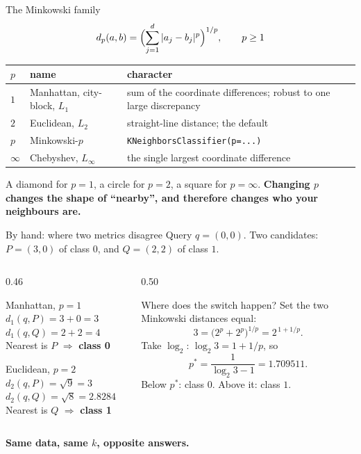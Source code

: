 \documentclass[aspectratio=169]{beamer}
\begin{document}
\begin{frame}[shrink=7]{The Minkowski family}
  \[
    d_p(a, b) = \Bigl( \sum_{j=1}^{d} |a_j - b_j|^{p} \Bigr)^{1/p},
    \qquad p \ge 1
  \]
  \begin{center}\small
  \begin{tabular}{@{}llp{6.8cm}@{}}
    \toprule
    $p$ & name & character\\
    \midrule
    $1$ & Manhattan, city-block, $L_1$ & sum of the coordinate differences;
      robust to one large discrepancy\\
    $2$ & Euclidean, $L_2$ & straight-line distance; the default\\
    $p$ & Minkowski-$p$ & \texttt{KNeighborsClassifier(p=...)}\\
    $\infty$ & Chebyshev, $L_\infty$ & the single largest coordinate
      difference\\
    \bottomrule
  \end{tabular}
  \end{center}
  \begin{center}\small
    A diamond for $p=1$, a circle for $p=2$, a square for $p=\infty$.
    \textbf{Changing $p$ changes the shape of ``nearby'', and therefore
    changes who your neighbours are.}
  \end{center}
\end{frame}

\begin{frame}[shrink=8]{By hand: where two metrics disagree}
Query $q = (0,0)$. Two candidates: $P = (3,0)$ of class $0$, and $Q = (2,2)$
of class $1$.
\begin{columns}[T]
  \begin{column}{0.46\textwidth}
    \begin{block}{Manhattan, $p=1$}
      \small $d_1(q,P) = 3 + 0 = 3$\\
      $d_1(q,Q) = 2 + 2 = 4$\\
      Nearest is $P$ $\Rightarrow$ \textbf{class 0}
    \end{block}
    \begin{block}{Euclidean, $p=2$}
      \small $d_2(q,P) = \sqrt{9} = 3$\\
      $d_2(q,Q) = \sqrt{8} = 2.8284$\\
      Nearest is $Q$ $\Rightarrow$ \textbf{class 1}
    \end{block}
  \end{column}
  \begin{column}{0.50\textwidth}
    \begin{exampleblock}{Where does the switch happen?}
      \small Set the two Minkowski distances equal:
      \[
        3 = \bigl(2^p + 2^p\bigr)^{1/p} = 2^{\,1 + 1/p}.
      \]
      Take $\log_2$: $\log_2 3 = 1 + 1/p$, so
      \[
        p^\ast = \frac{1}{\log_2 3 - 1} = 1.709511.
      \]
      Below $p^\ast$: class $0$. Above it: class $1$.
    \end{exampleblock}
  \end{column}
\end{columns}
\begin{center}\small
  \textbf{Same data, same $k$, opposite answers.}
\end{center}
\end{frame}
\end{document}
